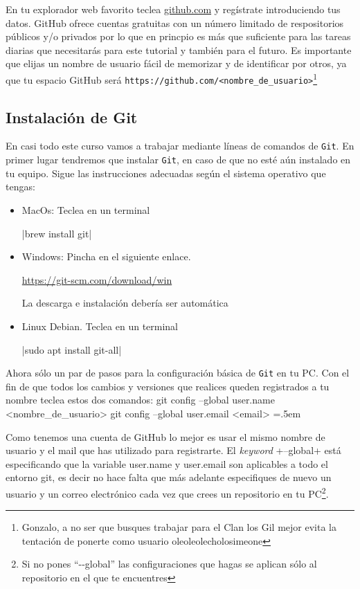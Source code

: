 \documentclass[a5paper,10pt]{article}
\newenvironment{cverbatim}
 {\SaveVerbatim{cverb}}
 {\endSaveVerbatim
  \flushleft\fboxrule=0pt\fboxsep=.5em
  \colorbox{bg}{\BUseVerbatim{cverb}}%
  \endflushleft
}
\begin{document}
    En tu explorador web favorito teclea \url{github.com} y regístrate introduciendo tus datos. GitHub ofrece cuentas gratuitas con un número limitado de respositorios públicos y/o privados por lo que en princpio es más que suficiente para las tareas diarias que necesitarás para este tutorial y también para el futuro. Es importante que elijas un nombre de usuario fácil de memorizar y de identificar por otros, ya que tu espacio GitHub será \verb+https://github.com/<nombre_de_usuario>+\footnote{Gonzalo, a no ser que busques trabajar para el Clan los Gil mejor evita la tentación de ponerte como usuario oleoleolecholosimeone}
    
  \subsection{Instalación de Git}
    En casi todo este curso vamos a trabajar mediante líneas de comandos de \verb+Git+. En primer lugar tendremos que instalar \verb+Git+, en caso de que no esté aún instalado en tu equipo. Sigue las instrucciones adecuadas según el sistema operativo que tengas: 
    
    \begin{itemize}
      \item MacOs: Teclea en un terminal
      
        \cverb|brew install git|

      \item Windows: Pincha en el siguiente enlace. 
      
      \url{https://git-scm.com/download/win}
      
      La descarga e instalación debería ser automática
        
      \item Linux Debian. Teclea en un terminal
      
        \cverb|sudo apt install git-all|
    \end{itemize}
    Ahora sólo un par de pasos para la configuración básica de \verb+Git+ en tu PC. Con el fin de que todos los cambios y versiones que realices queden registrados a tu nombre teclea estos dos comandos:
    \begin{cverbatim}
git config --global user.name <nombre_de_usuario>
git config --global user.email <email>
    \end{cverbatim}
    
    
    Como tenemos una cuenta de GitHub lo mejor es usar el mismo nombre de usuario y el mail que has utilizado para registrarte. El \emph{keyword} \cverb+--global+ está especificando que la variable user.name y user.email son aplicables a todo el entorno git, es decir no hace falta que más adelante especifiques de nuevo un usuario y un correo electrónico cada vez que crees un repositorio en tu PC\footnote{Si no pones ``-{}-global'' las configuraciones que hagas se aplican sólo al repositorio en el que te encuentres}.
    
\end{document}
